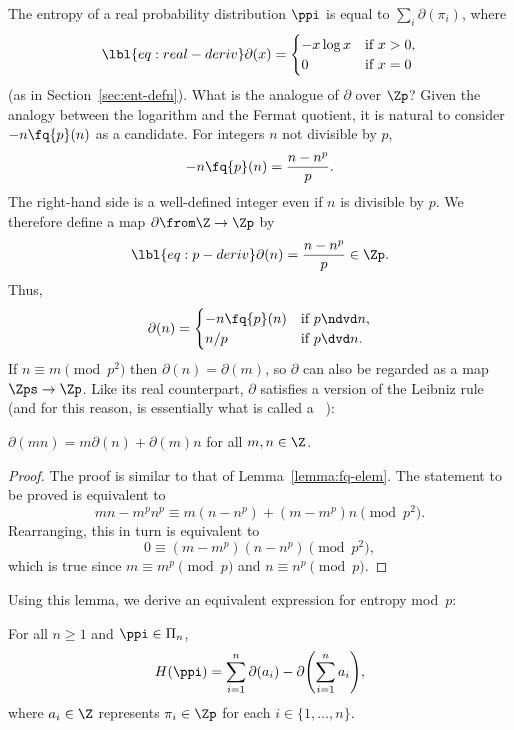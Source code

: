 The entropy of a real probability distribution $\ppi$ is equal
to $\sum_i \partial(\pi_i)$, where
% 
\begin{equation}
\lbl{eq:real-deriv}
\partial(x) = 
\begin{cases}
-x\log x        &\text{if } x > 0,   \\
0               &\text{if } x = 0
\end{cases}
\end{equation}
% 
(as in Section~\ref{sec:ent-defn}).  What is the analogue of $\partial$ over
$\Zp$?  Given the analogy between the logarithm and the Fermat quotient, it
is natural to consider $-n\fq{p}(n)$ as a candidate.  For integers $n$ not
divisible by $p$, 
\[
-n \fq{p}(n) 
=
\frac{n - n^p}{p}.
\]
The right-hand side is a well-defined integer even if $n$ is divisible by
$p$.  We therefore define a map $\partial \from \Z \to \Zp$ by
% 
\begin{equation}
\lbl{eq:p-deriv}
\partial(n) = \frac{n - n^p}{p} \in \Zp.
\end{equation}
% 
Thus,
\[
\partial(n)
=
\begin{cases}
-n\fq{p}(n)        &\text{if } p \ndvd n,  \\
n/p             &\text{if } p \dvd n.
\end{cases}
\]
If $n \equiv m \pmod{p^2}$ then $\partial(n) = \partial(m)$, so $\partial$
can also be regarded as a map $\Zps \to \Zp$.  Like its real counterpart,
$\partial$ satisfies a version of the Leibniz rule (and for this reason, is
essentially what is called a
%
%
%
%
%
~\cite{BuiuDCA,BuiuAAD}):

\begin{lemma}
$\partial(mn) = m\partial(n) + \partial(m)n$ for all $m, n \in \Z$.
\end{lemma}

\begin{proof}
The proof is similar to that of
Lemma~\ref{lemma:fq-elem}.  The statement to be
proved is equivalent to
\[
mn - m^p n^p \equiv m(n - n^p) + (m - m^p)n \pmod{p^2}.
\]
Rearranging, this in turn is equivalent to
\[
0 \equiv (m - m^p)(n - n^p) \pmod{p^2},
\]
which is true since $m \equiv m^p \pmod{p}$ and $n \equiv n^p \pmod{p}$.
\end{proof}

Using this lemma, we derive an equivalent expression for entropy mod~$p$:

\begin{lemma}
For all $n \geq 1$ and $\ppi \in \Pi_n$,
\[
H(\ppi)
=
\sum_{i = 1}^n \partial(a_i) 
- \partial\Biggl( \sum_{i = 1}^n a_i \Biggr),
\]
where $a_i \in \Z$ represents $\pi_i \in \Zp$ for each $i \in \{1, \ldots,
n\}$. 
\end{lemma}

